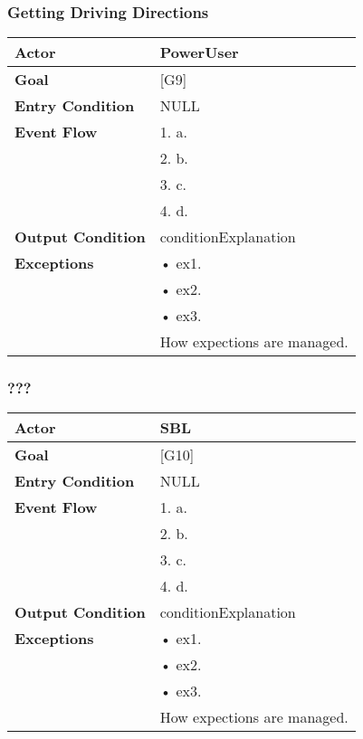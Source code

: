 \subsubsection{Getting Driving Directions}
\begin{tabular}{| l | p{8cm} |}
\hline
\textbf{Actor}      &       PowerUser \\
\hline
\textbf{Goal}       &       [G9]\\
\hline
\textbf{Entry Condition} &  NULL\\
\hline
\textbf{Event Flow}     &   1.	a.\\&
                                            2.	b.\\&
                                            3.	c.\\&
                                            4.  d.\\
\hline
\textbf{Output Condition} & conditionExplanation\\
\hline
\textbf{Exceptions} &       •   ex1.\\& 
                            •	ex2.\\&
                            •	ex3.\\& 
                           How expections are managed.\\
\hline
\end{tabular} 


\subsubsection{???}
\begin{tabular}{| l | p{8cm} |}
\hline
\textbf{Actor}      &       SBL \\
\hline
\textbf{Goal}       &       [G10]\\
\hline
\textbf{Entry Condition} &  NULL\\
\hline
\textbf{Event Flow}     &   1.	a.\\&
                                            2.	b.\\&
                                            3.	c.\\&
                                            4.  d.\\
\hline
\textbf{Output Condition} & conditionExplanation\\
\hline
\textbf{Exceptions} &       •   ex1.\\& 
                            •	ex2.\\&
                            •	ex3.\\& 
                           How expections are managed.\\
\hline
\end{tabular} 


